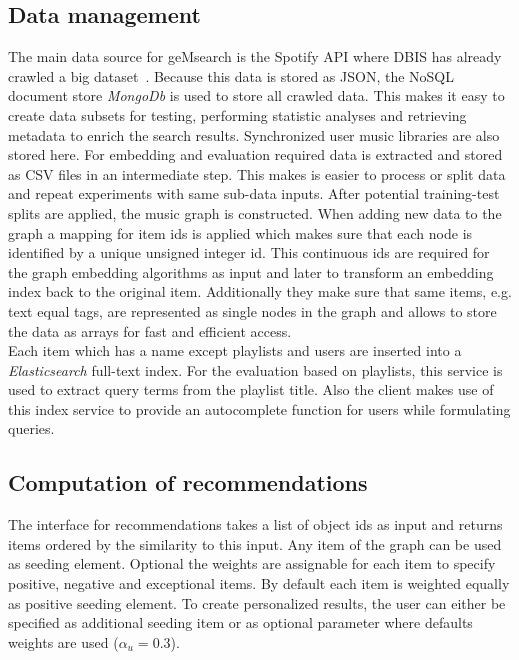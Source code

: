 \documentclass[sigconf]{acmart}
\begin{document}

\subsection{Data management}
The main data source for geMsearch is the Spotify API where DBIS has already crawled a big dataset~\cite{pichl2017improving}. Because this data is stored as JSON, the NoSQL document store \emph{MongoDb} is used to store all crawled data. This makes it easy to create data subsets for testing, performing statistic analyses and retrieving metadata to enrich the search results. Synchronized user music libraries are also stored here.
For embedding and evaluation required data is extracted and stored as CSV files in an intermediate step. This makes is easier to process or split data and repeat experiments with same sub-data inputs. After potential training-test splits are applied, the music graph is constructed. When adding new data to the graph a mapping for item ids is applied which makes sure that each node is identified by a unique unsigned integer id. This continuous ids are required for the graph embedding algorithms as input and later to transform an embedding index back to the original item. Additionally they make sure that same items, e.g. text equal tags, are represented as single nodes in the graph and allows to store the data as arrays for fast and efficient access. \\

Each item which has a name except playlists and users are inserted into a \emph{Elasticsearch} full-text index. For the evaluation based on playlists, this service is used to extract query terms from the playlist title. Also the client makes use of this index service to provide an autocomplete function for users while formulating queries.

\subsection{Computation of recommendations}
The interface for recommendations takes a list of object ids as input and returns items ordered by the similarity to this input. Any item of the graph can be used as seeding element. Optional the weights are assignable for each item to specify positive, negative and exceptional items. By default each item is weighted equally as positive seeding element. To create personalized results, the user can either be specified as additional seeding item or as optional parameter where defaults weights are used ($ \alpha_{u} = 0.3 $).
\end{document}
